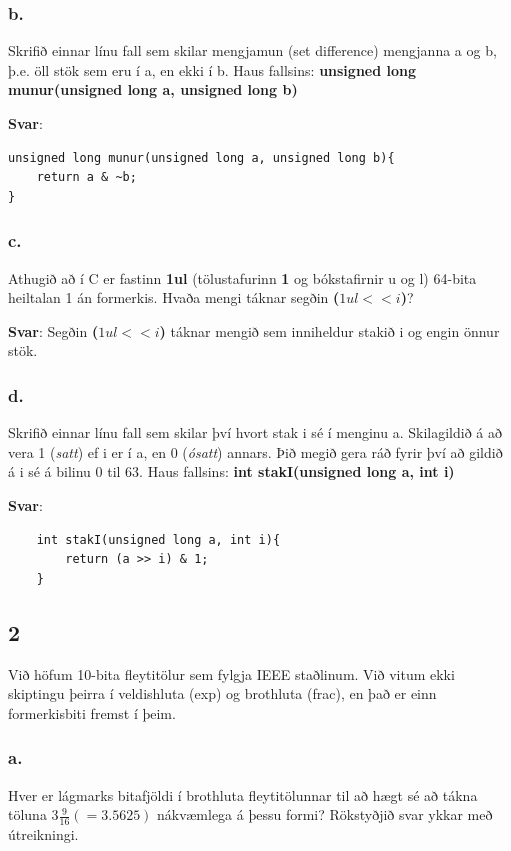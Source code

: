 \documentclass{article}
\begin{document}
\subsubsection{b.}  Skrifið einnar línu fall sem skilar mengjamun (set difference) mengjanna a og b,
þ.e. öll stök sem eru í a, en ekki í b. Haus fallsins:
\textbf{unsigned long munur(unsigned long a, unsigned long b)}

\textbf{Svar}:

\begin{lstlisting}
unsigned long munur(unsigned long a, unsigned long b){
    return a & ~b;
}
\end{lstlisting}

\subsubsection{c.}  Athugið að í C er fastinn \textbf{1ul} (tölustafurinn \textbf{1} og bókstafirnir u og l) 64-bita
heiltalan 1 án formerkis. Hvaða mengi táknar segðin \textbf{($1ul << i$)}?

\textbf{Svar}:
Segðin \textbf{($1ul << i$)} táknar mengið sem inniheldur stakið i og engin önnur stök.

\subsubsection{d.}Skrifið einnar línu fall sem skilar því hvort stak i sé í menginu a. Skilagildið á
að vera 1 (\textit{satt}) ef i er í a, en 0 (\textit{ósatt}) annars. Þið megið gera ráð fyrir því að
gildið á i sé á bilinu 0 til 63. Haus fallsins:
\textbf{int stakI(unsigned long a, int i)}

\textbf{Svar}:
\begin{lstlisting}
    int stakI(unsigned long a, int i){
        return (a >> i) & 1;
    }
\end{lstlisting}

\newpage

\subsection{2}
Við höfum 10-bita fleytitölur sem fylgja IEEE staðlinum. Við vitum ekki
skiptingu þeirra í veldishluta (exp) og brothluta (frac), en það er einn formerkisbiti
fremst í þeim.

\subsubsection{a.}Hver er lágmarks bitafjöldi í brothluta fleytitölunnar til að hægt sé að tákna
töluna $3 \frac{9}{16}(=3.5625)$ nákvæmlega á þessu formi? Rökstyðjið svar ykkar með útreikningi.
\end{document}
